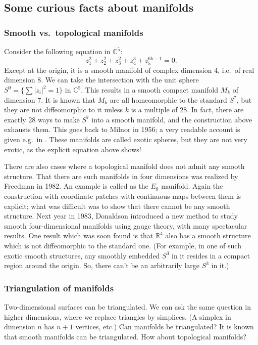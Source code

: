 \documentclass[12pt]{article}
\numberwithin{equation}{section}
\def\bC{\mathbb{C}}
\def\bR{\mathbb{R}}
\begin{document}
\subsection{Some curious facts about manifolds}
\label{sec:smooth-vs-topological}

\subsubsection{Smooth vs.~topological manifolds}
Consider the following equation in $\bC^5$:
\begin{equation}
z_1^2+z_2^2+z_3^2+z_4^3+z_5^{6k-1}=0.  
\end{equation} Except at the origin, it is a smooth manifold of complex dimension 4, 
i.e.~of real dimension 8.
We can take the intersection with the unit sphere $S^9=\{\sum|z_i|^2=1\}$ in $\bC^5$.
This results in a smooth compact manifold $M_k$ of dimension 7.
It is known that $M_k$ are all homeomorphic to the standard $S^7$,
but they are not diffeomorphic to it unless $k$ is a multiple of $28$.
In fact, there are exactly 28 ways to make $S^7$ into a smooth manifold,
and the construction above exhausts them.
This goes back to Milnor in 1956; a very readable account is given e.g.~in \cite{MeerThesis}.
These manifolds are called exotic spheres, 
but they are not very exotic, as the explicit equation above shows!

There are also cases where a topological manifold does not admit any smooth structure.
That there are such manifolds in four dimensions was realized by Freedman \cite{Freedman} in 1982.
An example is called as the $E_8$ manifold.
Again the construction with coordinate patches with continuous maps between them is explicit;
what was difficult was to show that there cannot be any smooth structure. 
Next year in 1983, Donaldson \cite{Donaldson} 
introduced a new method to study smooth four-dimensional manifolds
using gauge theory, with many spectacular results.
One result which was soon found is that $\bR^4$ also has a smooth structure 
which is not diffeomorphic to the standard one.
(For example, in one of such exotic smooth structures, 
any smoothly embedded $S^3$ in it resides in a compact region around the origin.
So, there can't be an arbitrarily large $S^3$ in it.)

\subsubsection{Triangulation of manifolds}
Two-dimensional surfaces can be triangulated. 
We can ask the same question in higher dimensions,
where we replace triangles by simplices. (A simplex in dimension $n$ has $n+1$ vertices, etc.)
Can manifolds be triangulated?
It is known that smooth manifolds can be triangulated. 
How about topological manifolds?
\end{document}
